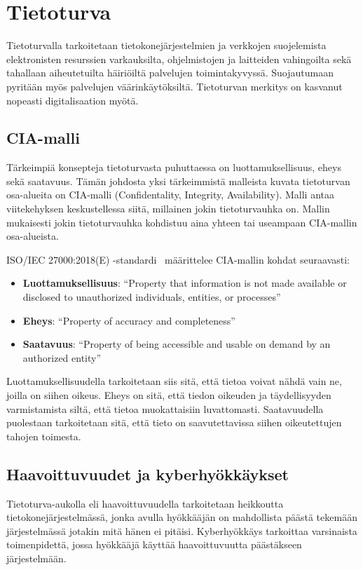 \chapter{Tietoturva}\label{tietoturva}

Tietoturvalla tarkoitetaan tietokonejärjestelmien ja verkkojen suojelemista elektronisten resurssien varkauksilta, ohjelmistojen ja laitteiden vahingoilta sekä tahallaan aiheutetuilta häiriöiltä palvelujen toimintakyvyssä. Suojautumaan pyritään myös palvelujen väärinkäytöksiltä. Tietoturvan merkitys on kasvanut nopeasti digitalisaation myötä.~\cite{andress2014basics}

\section{CIA-malli}\label{cia_malli}

Tärkeimpiä konsepteja tietoturvasta puhuttaessa on luottamuksellisuus, eheys sekä saatavuus. Tämän johdosta yksi tärkeimmistä malleista kuvata tietoturvan osa-alueita on CIA-malli (Confidentality, Integrity, Availability). Malli antaa viitekehyksen keskustellessa siitä, millainen jokin tietoturvauhka on. Mallin mukaisesti jokin tietoturvauhka kohdistuu aina yhteen tai useampaan CIA-mallin osa-alueista.

ISO/IEC 27000:2018(E) -standardi~\cite{ISO27000} määrittelee CIA-mallin kohdat seuraavasti:

\begin{itemize}
    \item \textbf{Luottamuksellisuus}: ``Property that information is not made available or disclosed to unauthorized individuals, entities, or processes''
    \item \textbf{Eheys}: ``Property of accuracy and completeness''
    \item \textbf{Saatavuus}: ``Property of being accessible and usable on demand by an authorized entity''
\end{itemize}

Luottamuksellisuudella tarkoitetaan siis sitä, että tietoa voivat nähdä vain ne, joilla on siihen oikeus. Eheys on sitä, että tiedon oikeuden ja täydellisyyden varmistamista siltä, että tietoa muokattaisiin luvattomasti. Saatavuudella puolestaan tarkoitetaan sitä, että tieto on saavutettavissa siihen oikeutettujen tahojen toimesta.~\cite{stamp2011information}

\section{Haavoittuvuudet ja kyberhyökkäykset}\label{haavoittuvuudet_ja_kyberhyokkaykset}
Tietoturva-aukolla eli haavoittuvuudella tarkoitetaan heikkoutta tietokonejärjestelmässä, jonka avulla hyökkääjän on mahdollista päästä tekemään järjestelmässä jotakin mitä hänen ei pitäisi. Kyberhyökkäys tarkoittaa varsinaista toimenpidettä, jossa hyökkääjä käyttää haavoittuvuutta päästäkseen järjestelmään.~\cite{andress2014basics}

